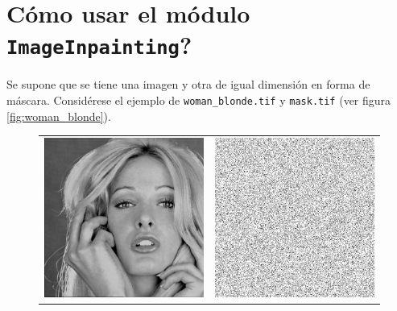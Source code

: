 \section{\textquestiondown C\'omo usar el m\'odulo \texttt{ImageInpainting}?}\label{sec:module_how_to_use}
Se supone que se tiene una imagen y otra de igual dimensión en forma de m\'ascara. Considérese el ejemplo de  \texttt{woman\_blonde.tif} y \texttt{mask.tif} (ver figura \ref{fig:woman_blonde}).
\begin{figure}[H]
	\centering
	\begin{tabular}{cc}
		\includegraphics[scale=0.2]{Graphics/Examples/woman_blonde.png}&
		\includegraphics[scale=0.2]{Graphics/Examples/mask.tif}\\

\end{tabular}
\end{figure}
